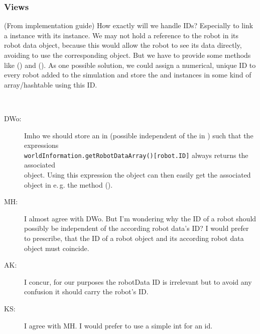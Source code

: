 \begin{appendix}
\subsubsection{Views}

\begin{designQuestion}
	(From implementation guide) How exactly will we handle IDs? Especially to link a  instance with its  instance. We may not hold a reference to the robot in its robot data object, because this would allow the robot to see its data directly, avoiding to use the corresponding  object. But we have to provide some methods like  () and (). As one possible solution, we could assign a numerical, unique ID to every robot added to the simulation and store the  and  instances in some kind of array/hashtable using this ID.
\end{designQuestion}
\begin{resolution}~
\begin{description}
	\item [DWo:] Imho we should store an  in  (possible independent of the  in ) such that the expressions \\ \texttt{worldInformation.getRobotDataArray()[robot.ID]} always returns the associated \\  object. Using this expression the  object can then easily get the associated  object in e.\,g. the method ().
	
	\item [MH:] I almost agree with DWo. But I'm wondering why the ID of a robot should possibly be independent of the according robot data's ID? I would prefer to prescribe, that the ID of a robot object and its according robot data object must coincide.
	
	\item [AK:] I concur, for our purposes the robotData ID is irrelevant but to avoid any confusion it should carry the robot's ID.
	
	\item [KS:] I agree with MH. I would prefer to use a simple int for an id.
\end{description}
\end{resolution}


\end{appendix}
